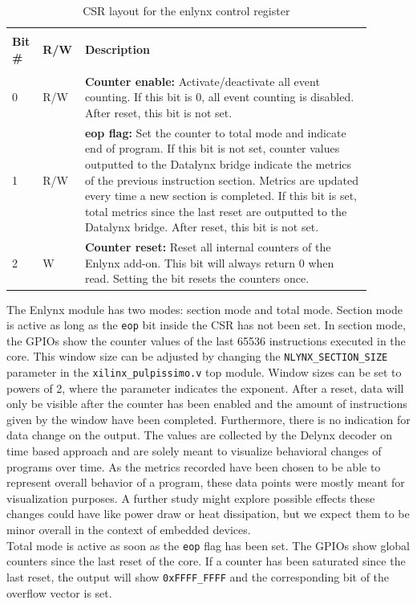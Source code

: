 \documentclass[../bachelor_paper.tex]{subfiles}
\begin{document}
\begin{table}
    \begin{tabular}{p{0.07\linewidth} p{0.07\linewidth} p{0.75\linewidth}}
        \hline \\[-0.9em]
        \textbf{Bit \#}  & \textbf{R/W}  & \textbf{Description} \\
        \hline \\[-0.9em]
        0               & R/W           & \textbf{Counter enable:} Activate/deactivate all event counting. If this bit is 0, all event counting is disabled. After reset, this bit is not set.\\
        1               & R/W           & \textbf{eop flag:} Set the counter to total mode and indicate end of program. If this bit is not set, counter values outputted to the Datalynx bridge indicate the metrics of the previous instruction section. Metrics are updated every time a new section is completed. If this bit is set, total metrics since the last reset are outputted to the Datalynx bridge. After reset, this bit is not set.\\
        2               & W             & \textbf{Counter reset:} Reset all internal counters of the Enlynx add-on. This bit will always return 0 when read. Setting the bit resets the counters once.\\
        \hline
    \end{tabular}
    \caption{\ac{CSR} layout for the enlynx control register}
    \label{tab:arch/enl/csrlayout}
\end{table}

The Enlynx module has two modes: section mode and total mode. Section mode is active as long as the \texttt{eop} bit inside the \ac{CSR} has not been set. In section mode, the GPIOs show the counter values of the last 65536
instructions executed in the core. This window size can be adjusted by changing the \texttt{NLYNX\_SECTION\_SIZE} parameter in the \texttt{xilinx\_pulpissimo.v} top module. Window sizes can be set to powers of 2, where the parameter indicates the exponent. After a reset, data will only be visible after the counter has been enabled and the amount of instructions given by the window have been completed. Furthermore, there is no indication for data change on the output. The values are collected by the Delynx decoder on time based approach and are solely meant to visualize behavioral changes of programs over time. As the metrics recorded have been chosen to be able to represent overall behavior of a program, these data points were mostly meant for visualization purposes. A further study might explore possible effects these changes could have like power draw or heat dissipation, but we expect them to be minor overall in the context of embedded devices.\\
Total mode is active as soon as the \texttt{eop} flag has been set. The GPIOs show global counters since the last reset of the core. If a counter has been saturated since the last reset, the output will show \texttt{0xFFFF\_FFFF} and the corresponding bit of the overflow vector is set.
\end{document}
